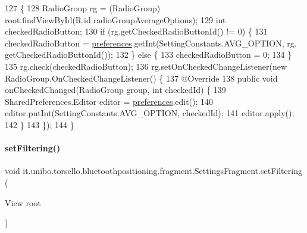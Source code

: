 \begin{DoxyCode}
127                                          \{
128         RadioGroup rg = (RadioGroup) root.findViewById(R.id.radioGroupAverageOptions);
129         \textcolor{keywordtype}{int} checkedRadioButton;
130         \textcolor{keywordflow}{if} (rg.getCheckedRadioButtonId() != 0) \{
131             checkedRadioButton = \hyperlink{classit_1_1unibo_1_1torsello_1_1bluetoothpositioning_1_1fragment_1_1SettingsFragment_a52480c4d5d81ca59fe4a98ae3c623ea4_a52480c4d5d81ca59fe4a98ae3c623ea4}{preferences}.getInt(SettingConstants.AVG\_OPTION, rg.
      getCheckedRadioButtonId());
132         \} \textcolor{keywordflow}{else} \{
133             checkedRadioButton = 0;
134         \}
135         rg.check(checkedRadioButton);
136         rg.setOnCheckedChangeListener(\textcolor{keyword}{new} RadioGroup.OnCheckedChangeListener() \{
137             @Override
138             \textcolor{keyword}{public} \textcolor{keywordtype}{void} onCheckedChanged(RadioGroup group, \textcolor{keywordtype}{int} checkedId) \{
139                 SharedPreferences.Editor editor = \hyperlink{classit_1_1unibo_1_1torsello_1_1bluetoothpositioning_1_1fragment_1_1SettingsFragment_a52480c4d5d81ca59fe4a98ae3c623ea4_a52480c4d5d81ca59fe4a98ae3c623ea4}{preferences}.edit();
140                 editor.putInt(SettingConstants.AVG\_OPTION, checkedId);
141                 editor.apply();
142             \}
143         \});
144     \}
\end{DoxyCode}
\hypertarget{classit_1_1unibo_1_1torsello_1_1bluetoothpositioning_1_1fragment_1_1SettingsFragment_a0d7b911602439aaf2a9ee4d5f9e41088_a0d7b911602439aaf2a9ee4d5f9e41088}{}\label{classit_1_1unibo_1_1torsello_1_1bluetoothpositioning_1_1fragment_1_1SettingsFragment_a0d7b911602439aaf2a9ee4d5f9e41088_a0d7b911602439aaf2a9ee4d5f9e41088} 
\paragraph{\texorpdfstring{set\+Filtering()}{setFiltering()}}
{\footnotesize\ttfamily void it.\+unibo.\+torsello.\+bluetoothpositioning.\+fragment.\+Settings\+Fragment.\+set\+Filtering (\begin{DoxyParamCaption}\item[{View}]{root }\end{DoxyParamCaption})\hspace{0.3cm}{\ttfamily [private]}}


